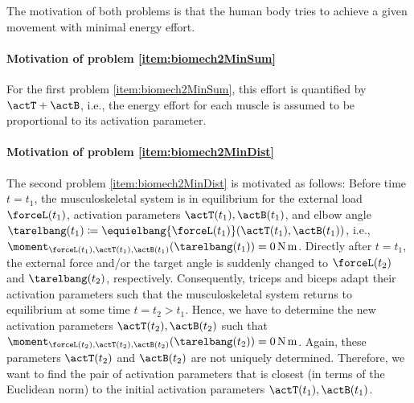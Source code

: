 \noindent
The motivation of both problems is that the human body tries to
achieve a given movement with minimal energy effort.

\paragraph{Motivation of problem \ref{item:biomech2MinSum}}

For the first problem \ref{item:biomech2MinSum},
this effort is quantified by $\actT + \actB$,
i.e., the energy effort for each muscle is assumed to be proportional
to its activation parameter.

\paragraph{Motivation of problem \ref{item:biomech2MinDist}}

The second problem \ref{item:biomech2MinDist} is motivated as follows:
Before time $t = t_1$, the musculoskeletal system is in equilibrium for
the external load $\forceL(t_1)$,
activation parameters $\actT(t_1), \actB(t_1)$, and elbow angle
$\tarelbang(t_1) \ceq \equielbang{\forceL(t_1)}(\actT(t_1), \actB(t_1))$, i.e.,
$\moment_{\forceL(t_1),\actT(t_1),\actB(t_1)}(\tarelbang(t_1))
= \SI{0}{\newton\meter}$.
Directly after $t = t_1$,
the external force and/or the target angle is suddenly changed
to $\forceL(t_2)$ and $\tarelbang(t_2)$, respectively.
Consequently, triceps and biceps adapt their activation parameters
such that the musculoskeletal system returns to equilibrium
at some time $t = t_2 > t_1$.
Hence, we have to determine the new activation parameters
$\actT(t_2), \actB(t_2)$ such that
$\moment_{\forceL(t_2),\actT(t_2),\actB(t_2)}(\tarelbang(t_2))
= \SI{0}{\newton\meter}$.
Again, these parameters
$\actT(t_2)$ and $\actB(t_2)$ are not uniquely determined.
Therefore, we want to find the pair of activation parameters
that is closest (in terms of the Euclidean norm) to the initial
activation parameters $\actT(t_1), \actB(t_1)$.

%

